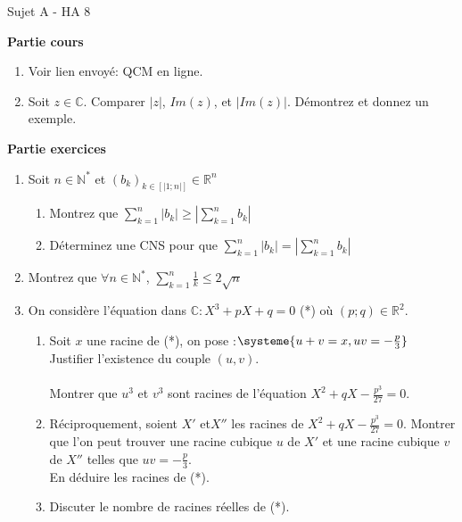 \documentclass[a4paper,11pt, landscape]{article}
\begin{document}
\begin{multicols*}{3}
\setlength{\columnsep}{1cm}
\centerline{Sujet A - HA 8}
\begin{flushleft}
  \textbf{Partie cours} 
\end{flushleft} 

\begin{enumerate}[leftmargin=*]
  \item Voir lien envoyé: QCM en ligne.
  \item Soit $z \in \mathbb{C}$. Comparer $|z|$, $Im (z)$, et $|Im (z)|$. Démontrez et donnez un exemple.
\end{enumerate}
\textbf{Partie exercices}
\begin{enumerate}[leftmargin=*]
  \item Soit $n \in \mathbb{N}^*$ et $(b_k)_{k \in [| 1; n|]} \in \mathbb{R}^n$
  \begin{enumerate}
    \item Montrez que $\sum\limits_{k=1}^{n}|b_k| \geq \left|\sum\limits_{k=1}^{n}b_k \right|$
    \item Déterminez une CNS pour que $\sum\limits_{k=1}^{n}|b_k| = \left|\sum\limits_{k=1}^{n}b_k \right|$
  \end{enumerate}
  \item Montrez que $\forall n \in \mathbb{N}^*$, $\sum\limits_{k=1}^{n}\frac{1}{k} \leq 2 \sqrt{n}$ 
  \item On considère l'équation dans $\mathbb{C}: X^3+pX+q = 0$ (*) où $(p;q)\in \mathbb{R}^2$.
  \begin{enumerate}
    \item Soit $x$ une racine de (*), on pose :$\systeme{u+v=x,uv=-\frac{p}{3}}$
    Justifier l'existence du couple $(u,v)$.\\ \\
    Montrer que $u^3$ et $v^3$ sont racines de l'équation $X^2 + qX-\frac{p^3}{27} = 0$.
    \item Réciproquement, soient $X'$ et$X''$ les racines de $X^2+qX-\frac{p^3}{27} = 0$. Montrer que l'on peut trouver une racine cubique $u$ de $X'$ et une racine cubique $v$ de $X''$ telles que $uv = -\frac{p}{3}$.\\
    En déduire les racines de (*).
    \item Discuter le nombre de racines réelles de (*).
    
  \end{enumerate}
  

\end{enumerate}
\end{multicols*}
\end{document}
